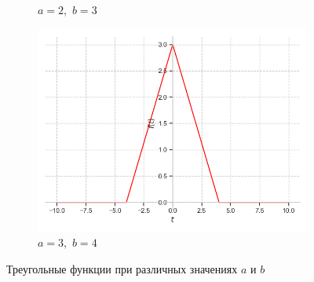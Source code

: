 \documentclass[a4paper, 16pt]{article}
\begin{document}
\begin{figure}[htbp]
\begin{subfigure}{0.3\textwidth}
            \caption{$a=2,\,\,b=3$}
            \label{fig:triangf_2}
        \end{subfigure}
        \hfill
        \begin{subfigure}{0.3\textwidth}
            \centering
            \includegraphics[width=\linewidth]{trif_a=3_b=4.png}
            \caption{$a=3,\,\,b=4$}
            \label{fig:triangf_3}
        \end{subfigure}
        \caption{Треугольные функции при различных значениях $a$ и $b$}
        \label{fig:triangfs}
    \end{figure}
\end{document}
